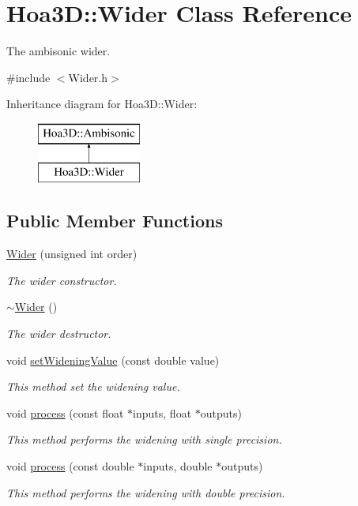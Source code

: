 \hypertarget{class_hoa3_d_1_1_wider}{\section{Hoa3\-D\-:\-:Wider Class Reference}
\label{class_hoa3_d_1_1_wider}
}


The ambisonic wider.  




{\ttfamily \#include $<$Wider.\-h$>$}

Inheritance diagram for Hoa3\-D\-:\-:Wider\-:\begin{figure}[H]
\begin{center}
\leavevmode
\includegraphics[height=2.000000cm]{class_hoa3_d_1_1_wider}
\end{center}
\end{figure}
\subsection*{Public Member Functions}
\begin{DoxyCompactItemize}
\item 
\hyperlink{class_hoa3_d_1_1_wider_a7f1f80e3329872d06f8e81f60f24e102}{Wider} (unsigned int order)
\begin{DoxyCompactList}\small\item\em The wider constructor. \end{DoxyCompactList}\item 
\hyperlink{class_hoa3_d_1_1_wider_a4a2770414c2753a9c92740f02641db38}{$\sim$\-Wider} ()
\begin{DoxyCompactList}\small\item\em The wider destructor. \end{DoxyCompactList}\item 
void \hyperlink{class_hoa3_d_1_1_wider_a5981d4dafbb0d2ce4ea20ec7cd1fb114}{set\-Widening\-Value} (const double value)
\begin{DoxyCompactList}\small\item\em This method set the widening value. \end{DoxyCompactList}\item 
void \hyperlink{class_hoa3_d_1_1_wider_a605d68c56ca7a541a9e91bd2aa9a9ea0}{process} (const float $\ast$inputs, float $\ast$outputs)
\begin{DoxyCompactList}\small\item\em This method performs the widening with single precision. \end{DoxyCompactList}\item 
void \hyperlink{class_hoa3_d_1_1_wider_a94fa445b540cbafeaafa05d4ed1a20bf}{process} (const double $\ast$inputs, double $\ast$outputs)
\begin{DoxyCompactList}\small\item\em This method performs the widening with double precision. \end{DoxyCompactList}\end{DoxyCompactItemize}


